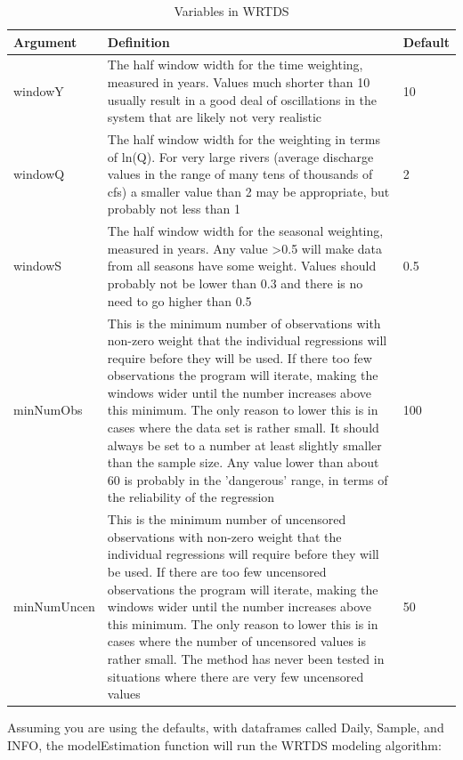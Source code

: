\documentclass[a4paper,11pt]{article}
\begin{document}
\begin{table}
\caption{Variables in WRTDS  \label{tab:WRTDS}}
\begin{tabularx}{\textwidth}{lXl}
\hline
  \textbf{Argument} & \textbf{Definition} & \textbf{Default} \\
\hline
windowY & The half window width for the time weighting, measured in years.  Values much shorter than 10 usually result in a good deal of oscillations in the system that are likely not very realistic & 10\\
windowQ & The half window width for the weighting in terms of ln(Q).  For very large rivers (average discharge values in the range of many tens of thousands of cfs) a smaller value than 2 may be appropriate, but probably not less than 1 & 2 \\
windowS & The half window width for the seasonal weighting, measured in years.  Any value >0.5 will make data from all seasons have some weight.  Values should probably not be lower than 0.3 and there is no need to go higher than 0.5 & 0.5 \\
minNumObs & This is the minimum number of observations with non-zero weight that the individual regressions will require before they will be used.  If there too few observations the program will iterate, making the windows wider until the number increases above this minimum.  The only reason to lower this is in cases where the data set is rather small.  It should always be set to a number at least slightly smaller than the sample size.  Any value lower than about 60 is probably in the 'dangerous' range, in terms of the reliability of the regression & 100 \\ 
minNumUncen & This is the minimum number of uncensored observations with non-zero weight that the individual regressions will require before they will be used.  If there are too few uncensored observations the program will iterate, making the windows wider until the number increases above this minimum.  The only reason to lower this is in cases where the number of uncensored values is rather small.  The method has never been tested in situations where there are very few uncensored values & 50 \\
\hline
\end{tabularx}

\end{table}

\FloatBarrier

Assuming you are using the defaults, with dataframes called Daily, Sample, and INFO, the modelEstimation function will run the WRTDS modeling algorithm:
\end{document}
